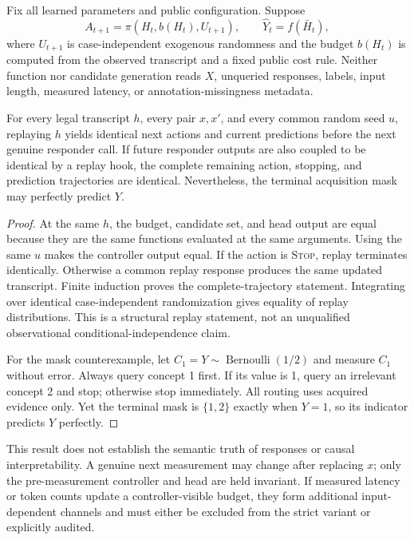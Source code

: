 \begin{acamprop}
\label{prop:acam-noninterference}
Fix all learned parameters and public configuration. Suppose
\[
 A_{t+1}=\pi(H_t,b(H_t),U_{t+1}),\qquad
 \widehat Y_t=f(\bar H_t),
\]
where $U_{t+1}$ is case-independent exogenous randomness and the budget
$b(H_t)$ is computed from the observed transcript and a fixed public
cost rule. Neither function nor candidate generation reads $X$,
unqueried responses, labels, input length, measured latency, or
annotation-missingness metadata.

For every legal transcript $h$, every pair $x,x'$, and every common
random seed $u$, replaying $h$ yields identical next actions and current
predictions before the next genuine responder call. If future responder
outputs are also coupled to be identical by a replay hook, the complete
remaining action, stopping, and prediction trajectories are identical.
Nevertheless, the terminal acquisition mask may perfectly predict $Y$.
\end{acamprop}

\begin{proof}
At the same $h$, the budget, candidate set, and head output are equal
because they are the same functions evaluated at the same arguments.
Using the same $u$ makes the controller output equal. If the action is
\textnormal{\textsc{Stop}}, replay terminates identically. Otherwise a common replay
response produces the same updated transcript. Finite induction proves
the complete-trajectory statement. Integrating over identical
case-independent randomization gives equality of replay distributions.
This is a structural replay statement, not an unqualified observational
conditional-independence claim.

For the mask counterexample, let $C_1=Y\sim\operatorname{Bernoulli}(1/2)$
and measure $C_1$ without error. Always query concept 1 first. If its value
is 1, query an irrelevant concept 2 and stop; otherwise stop immediately.
All routing uses acquired evidence only. Yet the terminal mask is
$\{1,2\}$ exactly when $Y=1$, so its indicator predicts $Y$ perfectly.
\end{proof}

This result does not establish the semantic truth of responses or causal
interpretability. A genuine next measurement may change after replacing
$x$; only the pre-measurement controller and head are held invariant.
If measured latency or token counts update a controller-visible budget,
they form additional input-dependent channels and must either be
excluded from the strict variant or explicitly audited.

